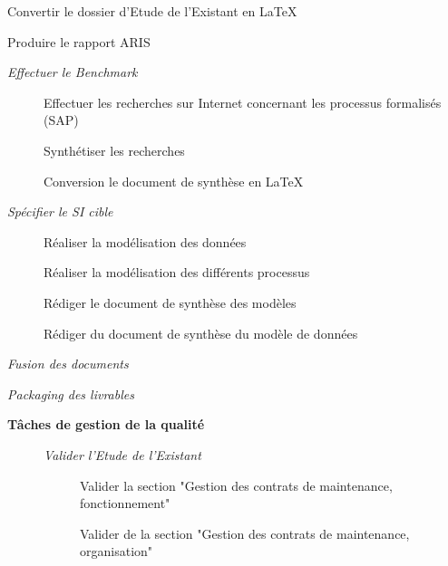 \begin{description}
\begin{description}
\begin{description}
\begin{description}
                        \end{description}
                    \item[\textbullet] Convertir le dossier d’Etude de l’Existant en LaTeX
                    \item[\textbullet] Produire le rapport ARIS
                \end{description}
            \item[\textbullet] \it{Effectuer le Benchmark}
                \begin{description}
                    \item[\textbullet] Effectuer les recherches sur Internet concernant les processus formalisés (SAP)
                    \item[\textbullet] Synthétiser les recherches
                    \item[\textbullet] Conversion le document de synthèse en LaTeX
                \end{description}
            \item[\textbullet] \it{Spécifier le SI cible}
                \begin{description}
                    \item[\textbullet] Réaliser la modélisation des données
                    \item[\textbullet] Réaliser la modélisation des différents processus
                    \item[\textbullet] Rédiger le document de synthèse des modèles
                    \item[\textbullet] Rédiger du document de synthèse du modèle de données
                \end{description}
            \item[\textbullet] \it{Fusion des documents}
            \item[\textbullet] \it{Packaging des livrables}
        \end{description}
    \item[] \bf{Tâches de gestion de la qualité}
        \begin{description}
            \item[\textbullet] \it{Valider l’Etude de l’Existant}
                \begin{description}
                    \item[\textbullet] Valider la section "Gestion des contrats de maintenance, fonctionnement"
                    \item[\textbullet] Valider de la section "Gestion des contrats de maintenance, organisation"

\end{description}
\end{description}
\end{description}
